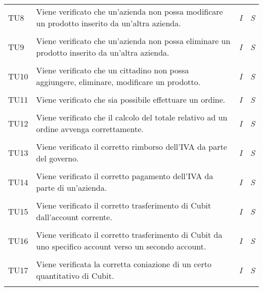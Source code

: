 \begin{longtable}{ >{\centering}p{} >{}p{}
				>{\centering}p{} >{\centering}p{}}
			\tabularnewline
			\hypertarget{TU8}{TU8} &Viene verificato che un'azienda non possa 
			modificare un prodotto inserito da un'altra azienda. & \textit{I} & 
			\textit{S}\\ 
			
			\tabularnewline
			\hypertarget{TU9}{TU9} & Viene verificato che un'azienda non possa 
			eliminare un prodotto inserito da un'altra azienda. & \textit{I} & 
			\textit{S}\\ 
			
			\tabularnewline
			\hypertarget{TU10}{TU10} & Viene verificato che un cittadino non 
			possa aggiungere, eliminare, modificare un prodotto. & \textit{I} & 
			\textit{S}\\
			
			\tabularnewline
			\hypertarget{TU11}{TU11} & Viene verificato che sia possibile 
			effettuare un ordine. & \textit{I} & \textit{S}\\ 
			
			\tabularnewline
			\hypertarget{TU12}{TU12} & Viene verificato che il calcolo del 
			totale relativo ad un ordine avvenga correttamente. & \textit{I} & 
			\textit{S}\\ 
			
			\tabularnewline
			\hypertarget{TU13}{TU13} & Viene verificato il corretto rimborso 
			dell'IVA da parte del governo. & \textit{I} & \textit{S}\\ 
			
			\tabularnewline
			\hypertarget{TU14}{TU14} & Viene verificato il corretto pagamento 
			dell'IVA da parte di un'azienda. & \textit{I} & \textit{S}\\
			
			\tabularnewline
			\hypertarget{TU15}{TU15} & Viene verificato il corretto 
			trasferimento di Cubit dall'account corrente. & \textit{I} & 
			\textit{S}\\ 
			
			\tabularnewline
			\hypertarget{TU16}{TU16} & Viene verificato il corretto 
			trasferimento di Cubit da uno specifico account verso un secondo 
			account. & \textit{I} & \textit{S}\\ 
			
			\tabularnewline
			\hypertarget{TU17}{TU17} & Viene verificata la corretta coniazione 
			di un certo quantitativo di Cubit. & \textit{I} & \textit{S}\\  
			
			\tabularnewline
		\end{longtable}

